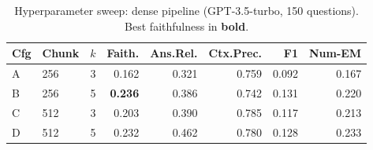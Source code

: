 \begin{table}[t]
\centering
\caption{Hyperparameter sweep: dense pipeline (GPT-3.5-turbo, 150 questions). Best faithfulness in \textbf{bold}.}
\label{tab:t16sweep}
\begin{tabular}{llrrrrrr}
\toprule
Cfg & Chunk & $k$ & Faith. & Ans.Rel. & Ctx.Prec. & F1 & Num-EM \\
\midrule
A & 256 & 3 & 0.162 & 0.321 & 0.759 & 0.092 & 0.167 \\
B & 256 & 5 & \textbf{0.236} & 0.386 & 0.742 & 0.131 & 0.220 \\
C & 512 & 3 & 0.203 & 0.390 & 0.785 & 0.117 & 0.213 \\
D & 512 & 5 & 0.232 & 0.462 & 0.780 & 0.128 & 0.233 \\
\bottomrule
\end{tabular}
\end{table}